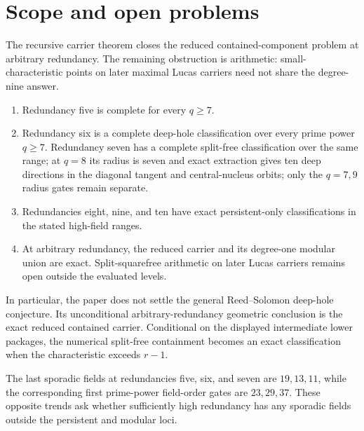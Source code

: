 \section{Scope and open problems}\label{sec:boundary}

The recursive carrier theorem closes the reduced contained-component problem
at arbitrary redundancy.  The remaining obstruction is arithmetic:
small-characteristic points on later maximal Lucas carriers need not share
the degree-nine answer.
\begin{enumerate}[leftmargin=2em]
\item Redundancy five is complete for every $q\geq7$.
\item Redundancy six is a complete deep-hole classification over every
      prime power \(q\geq7\).  Redundancy seven has a complete split-free
      classification over the same range; at $q=8$ its radius is seven and
      exact extraction gives ten deep directions in the diagonal tangent and
      central-nucleus orbits; only the $q=7,9$ radius gates remain separate.
\item Redundancies eight, nine, and ten have exact persistent-only
      classifications in the stated high-field ranges.
\item At arbitrary redundancy, the reduced carrier and its degree-one modular
      union are exact.  Split-squarefree arithmetic on later Lucas carriers
      remains open outside the evaluated levels.
\end{enumerate}

In particular, the paper does not settle the general Reed--Solomon
deep-hole conjecture.  Its unconditional arbitrary-redundancy geometric
conclusion is the exact reduced contained carrier.  Conditional on the
displayed intermediate lower packages, the numerical split-free containment
becomes an exact classification when the characteristic exceeds \(r-1\).

The last sporadic fields at redundancies five, six, and seven are
\(19,13,11\), while the corresponding first prime-power field-order gates
are \(23,29,37\).  These opposite trends ask whether sufficiently high
redundancy has any sporadic fields outside the persistent and modular
loci.
